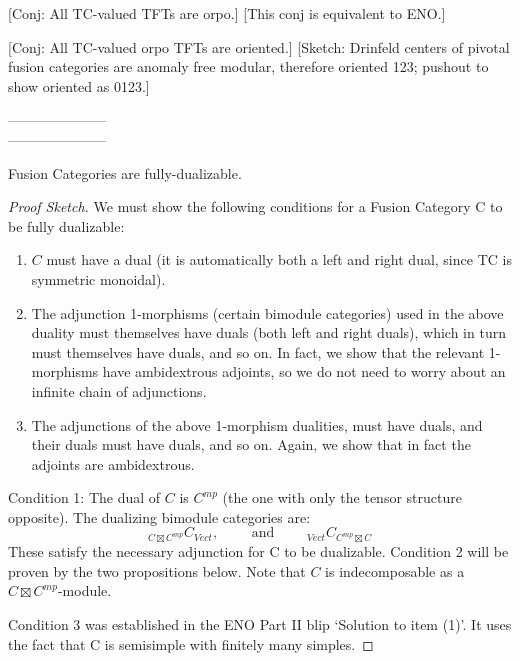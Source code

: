 \documentclass{amsart}
\begin{document}
	[Conj: All TC-valued TFTs are orpo.] [This conj is equivalent to ENO.]
	
	[Conj: All TC-valued orpo TFTs are oriented.] [Sketch: Drinfeld centers of pivotal fusion categories are anomaly free modular, therefore oriented 123; pushout to show oriented as 0123.]



\nid ---------------------\\
---------------------

\begin{theorem}
	Fusion Categories are fully-dualizable. 
\end{theorem}
	
\begin{proof}[Proof Sketch]
We must show the following conditions for a Fusion Category C to be fully dualizable: 
	\begin{enumerate}
		\item $C$ must have a dual (it is automatically both a left and right dual, since TC is symmetric monoidal).
		\item The adjunction 1-morphisms (certain bimodule categories) used in the above duality must themselves have duals (both left and right duals), which in turn must themselves have duals, and so on.  In fact, we show that the relevant 1-morphisms have ambidextrous adjoints, so we do not need to worry about an infinite chain of adjunctions.
		\item The adjunctions of the above 1-morphism dualities, must have duals, and their duals must have duals, and so on.  Again, we show that in fact the adjoints are ambidextrous.
	\end{enumerate}

Condition 1: The dual of $C$ is $C^{mp}$ (the one with only the tensor structure opposite). The dualizing bimodule categories are:
\begin{equation*}
	{}_{C \boxtimes C^{mp}} C_{Vect}, \qquad \text{ and } \qquad {}_{Vect} C_{C^{mp} \boxtimes C}	
\end{equation*} 
These satisfy the necessary adjunction for C to be dualizable. 
Condition 2 will be proven by the two propositions below. Note that $C$ is indecomposable as a $C \boxtimes C^{mp}$-module.  
	
Condition 3 was established in the ENO Part II blip `Solution to item (1)'.  It uses the fact that C is semisimple with finitely many simples. 	
	
\end{proof}	
	
\end{document}
